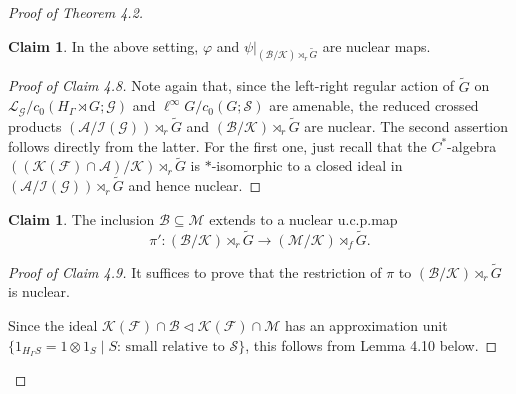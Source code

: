 \documentclass{amsart}
\theoremstyle{definition}
\newtheorem{claim}[theorem]{Claim}
\newcommand{\Cstaralg}{$C^{\ast}$-algebra\xspace}
\begin{document}
\begin{proof}[Proof of Theorem 4.2]
\begin{claim}
In the above setting, $\varphi$ and $\psi\vert_{(\mathscr{B}/\mathcal{K})\rtimes_r \tilde{G}}$ are nuclear maps. 
\end{claim}
\begin{proof}[Proof of Claim 4.8]
Note again that, since the left-right regular action of $\tilde{G}$ on 
$\mathcal{L}_{\mathcal{G}} / c_0(H_{\Gamma}\rtimes G; \mathcal{G})$ 
and $\ell^{\infty}G/c_0(G;\mathcal{S})$ are amenable, 
the reduced crossed products 
$(\mathscr{A} / \mathcal{I}(\mathcal{G}))\rtimes_r \tilde{G}$ 
and $(\mathscr{B}/\mathcal{K})\rtimes_r \tilde{G}$ are nuclear. 
The second assertion follows directly from the latter. 
For the first one, just recall that the \Cstaralg
$((\mathcal{K}(\mathcal{F})\cap \mathscr{A}) / \mathcal{K})\rtimes_r \tilde{G}$
is $\ast$-isomorphic to a closed ideal in
$(\mathscr{A} / \mathcal{I}(\mathcal{G}))\rtimes_r \tilde{G}$
and hence nuclear. 
\end{proof}





\begin{claim}
The inclusion $\mathscr{B}\subseteq \mathscr{M}$ extends to a nuclear u.c.p.\@ map
\[
\pi' : (\mathscr{B}/\mathcal{K})\rtimes_r \tilde{G}
\longrightarrow (\mathscr{M}/\mathcal{K})\rtimes_f \tilde{G}. 
\]
\end{claim}
\begin{proof}[Proof of Claim 4.9]
It suffices to prove that the restriction of $\pi$ 
to $(\mathscr{B}/\mathcal{K})\rtimes_r \tilde{G}$ is nuclear. 

Since the ideal 
$\mathcal{K}(\mathcal{F})\cap \mathscr{B}\lhd \mathcal{K}(\mathcal{F})\cap \mathscr{M}$ has an approximation unit $\{ 1_{H_{\Gamma}S} = 1\otimes 1_S\mid S
\text{: small relative to }
\mathcal{S}\}$, this follows from Lemma 4.10 below. 
\end{proof}




\end{proof}
\end{document}
